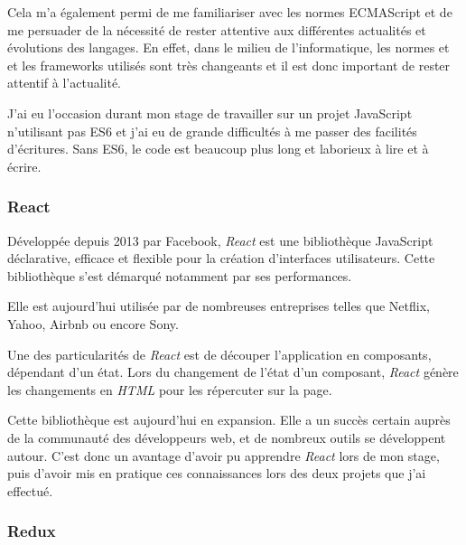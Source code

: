 Cela m'a également permi de me familiariser avec les normes ECMAScript
et de me persuader de la nécessité de rester attentive aux différentes
actualités et évolutions des langages. En effet, dans le milieu de
l'informatique, les normes et et les frameworks utilisés sont très
changeants et il est donc important de rester attentif à l'actualité.

\bigskip

J'ai eu l'occasion durant mon stage de travailler sur un projet
JavaScript n'utilisant pas ES6 et j'ai eu de grande difficultés à me
passer des facilités d'écritures. Sans ES6, le code est beaucoup plus
long et laborieux à lire et à écrire.

\bigskip

\subsubsection{React}\label{react}

\bigskip

Développée depuis 2013 par Facebook, \emph{React} est une bibliothèque
JavaScript déclarative, efficace et flexible pour la création
d'interfaces utilisateurs. Cette bibliothèque s'est démarqué notamment
par ses performances.

\bigskip

Elle est aujourd'hui utilisée par de nombreuses entreprises telles que
Netflix, Yahoo, Airbnb ou encore Sony.

\bigskip

Une des particularités de \emph{React} est de découper l'application en
composants, dépendant d'un état. Lors du changement de l'état d'un
composant, \emph{React} génère les changements en \emph{HTML} pour les
répercuter sur la page.

\bigskip

Cette bibliothèque est aujourd'hui en expansion. Elle a un succès
certain auprès de la communauté des développeurs web, et de nombreux
outils se développent autour. C'est donc un avantage d'avoir pu
apprendre \emph{React} lors de mon stage, puis d'avoir mis en pratique
ces connaissances lors des deux projets que j'ai effectué.

\bigskip

\subsubsection{Redux}\label{redux}

\bigskip

